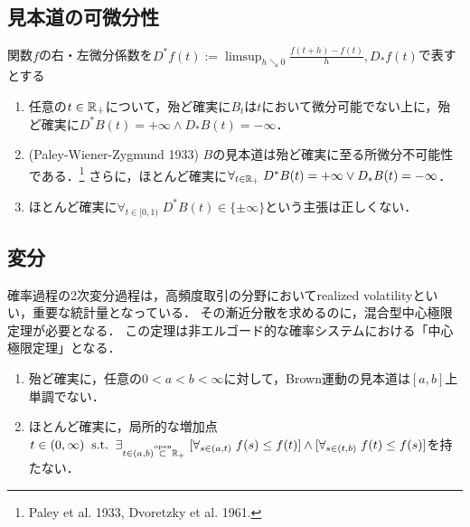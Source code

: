 \documentclass[uplatex,dvipdfmx]{jsreport}
\begin{document}
\subsection{見本道の可微分性}


\begin{proposition}
    関数$f$の右・左微分係数を$D^*f(t):=\limsup_{h\searrow0}\frac{f(t+h)-f(t)}{h},D_*f(t)$で表すとする
    \begin{enumerate}
        \item 任意の$t\in\mathbb{R}_+$について，殆ど確実に$B_t$は$t$において微分可能でない上に，殆ど確実に$D^*B(t)=+\infty\land D_*B(t)=-\infty$．
        \item (Paley-Wiener-Zygmund 1933) $B$の見本道は殆ど確実に至る所微分不可能性である．\footnote{Paley et al. 1933, Dvoretzky et al. 1961.}
        さらに，ほとんど確実に$\forall_{t\in\mathbb{R}_+}\;D^*B(t)=+\infty\lor D_*B(t)=-\infty$．
        \item ほとんど確実に$\forall_{t\in[0,1)}\;D^*B(t)\in\{\pm\infty\}$という主張は正しくない．
    \end{enumerate}
\end{proposition}

\subsection{変分}

\begin{tcolorbox}[colframe=ForestGreen, colback=ForestGreen!10!white,breakable,colbacktitle=ForestGreen!40!white,coltitle=black,fonttitle=\bfseries\sffamily,
title=]
    確率過程の2次変分過程は，高頻度取引の分野においてrealized volatilityといい，重要な統計量となっている．
    その漸近分散を求めるのに，混合型中心極限定理が必要となる．
    この定理は非エルゴード的な確率システムにおける「中心極限定理」となる．
\end{tcolorbox}

\begin{proposition}[erratic]\mbox{}
    \begin{enumerate}
        \item 殆ど確実に，任意の$0<a<b<\infty$に対して，Brown運動の見本道は$[a,b]$上単調でない．
        \item ほとんど確実に，局所的な増加点$t\in(0,\infty)\;\;\mathrm{s.t.}\;\;\exists_{t\in(a,b)\overset{\mathrm{open}}{\subset}\mathbb{R}_+}\;[\forall_{s\in(a,t)}\;f(s)\le f(t)]\land[\forall_{s\in(t,b)}\;f(t)\le f(s)]$を持たない．
    \end{enumerate}
\end{proposition}
\end{document}
